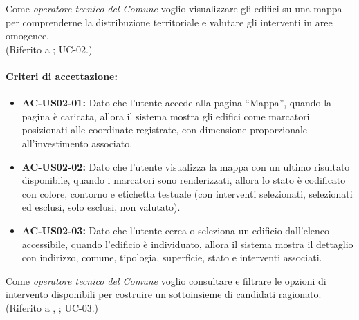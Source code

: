  \label{us:mappa}
Come \textit{operatore tecnico del Comune} voglio visualizzare gli edifici su una mappa per comprenderne la distribuzione territoriale e valutare gli interventi in aree omogenee. \\ (Riferito a ; UC-02.)

\paragraph{Criteri di accettazione:}
\begin{itemize}[leftmargin=1.4em]
    \item \textbf{AC-US02-01:} Dato che l'utente accede alla pagina ``Mappa'', quando la pagina è caricata, allora il sistema mostra gli edifici come marcatori posizionati alle coordinate registrate, con dimensione proporzionale all'investimento associato.
    \item \textbf{AC-US02-02:} Dato che l'utente visualizza la mappa con un ultimo risultato disponibile, quando i marcatori sono renderizzati, allora lo stato è codificato con colore, contorno e etichetta testuale (con interventi selezionati, selezionati ed esclusi, solo esclusi, non valutato).
    \item \textbf{AC-US02-03:} Dato che l'utente cerca o seleziona un edificio dall'elenco accessibile, quando l'edificio è individuato, allora il sistema mostra il dettaglio con indirizzo, comune, tipologia, superficie, stato e interventi associati.
\end{itemize}

 \label{us:interventi}
Come \textit{operatore tecnico del Comune} voglio consultare e filtrare le opzioni di intervento disponibili per costruire un sottoinsieme di candidati ragionato. \\ (Riferito a , ; UC-03.)

